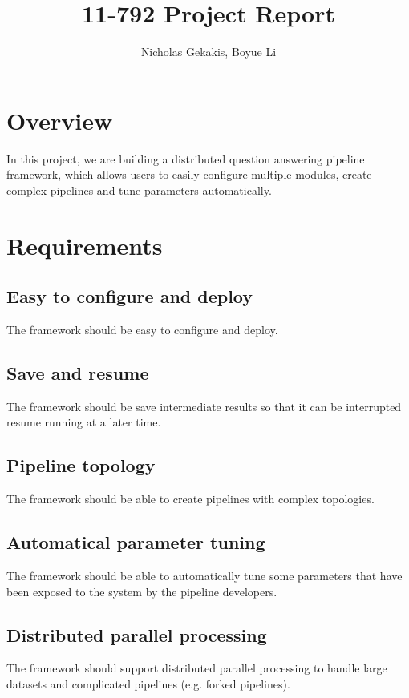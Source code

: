 \documentclass{article}
\begin{document}
\title{11-792 Project Report}
 
\author{Nicholas Gekakis, Boyue Li}
 
\maketitle
 
\section{Overview}

In this project, we are building a distributed question answering pipeline framework,
which allows users to easily configure multiple modules,
create complex pipelines and tune parameters automatically.

\section{Requirements}

    \subsection{Easy to configure and deploy}
    The framework should be easy to configure and deploy.

    \subsection{Save and resume}
    The framework should be save intermediate results so that it can be interrupted resume running at a later time.

    \subsection{Pipeline topology}
    The framework should be able to create pipelines with complex topologies.

    \subsection{Automatical parameter tuning}
    The framework should be able to automatically tune some parameters that have been exposed to the system by the pipeline developers.

    \subsection{Distributed parallel processing}
    The framework should support distributed parallel processing to handle large datasets and complicated pipelines (e.g. forked pipelines).
\end{document}
